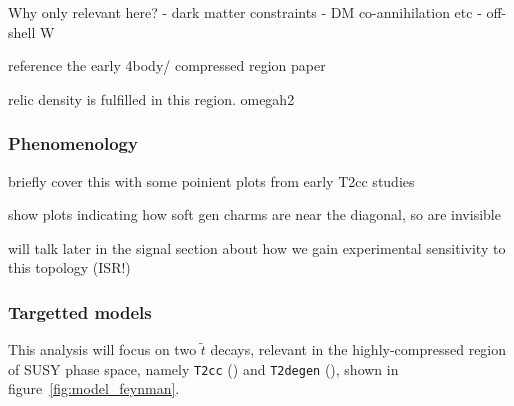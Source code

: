 Why only relevant here?
- dark matter constraints - DM co-annihilation etc
- off-shell W

reference the early 4body/ compressed region paper

relic density is fulfilled in this region. omegah2

\subsubsection{Phenomenology}
briefly cover this with some poinient plots from early T2cc studies

show plots indicating how soft gen charms are near the diagonal, so are
invisible

will talk later in the signal section about how we gain experimental sensitivity
to this topology (ISR!)


\subsubsection{Targetted models}
This analysis will focus on two $\tilde{t}$ decays, relevant in the
highly-compressed region of SUSY phase space, namely \texttt{T2cc}
(\Ttwocc) and \texttt{T2degen} (\Ttwodegen), shown in
figure~\ref{fig:model_feynman}.

